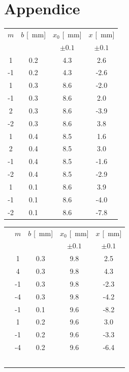 \documentclass[10pt,oneside,a4paper]{article}
\begin{document}
\newpage
\section{Appendice}


\begin{minipage}{.5\linewidth}
\begin{center}
\label{tab:misuraLambda}
\begin{tabular}{c|c|c|c}
$m$ & $b$ [\SI{}{mm}] & $x_0$ [\SI{}{mm}] & $x$ [\SI{}{mm}]\\
 & & $\pm 0.1$ & $\pm 0.1$\\
\hline
  1 & 0.2 & 4.3 &  2.6 \\
 -1 & 0.2 & 4.3 & -2.6 \\
  1 & 0.3 & 8.6 & -2.0 \\
 -1 & 0.3 & 8.6 &  2.0 \\
  2 & 0.3 & 8.6 & -3.9 \\
 -2 & 0.3 & 8.6 &  3.8 \\
  1 & 0.4 & 8.5 &  1.6 \\
  2 & 0.4 & 8.5 &  3.0 \\
 -1 & 0.4 & 8.5 & -1.6 \\
 -2 & 0.4 & 8.5 & -2.9 \\
  1 & 0.1 & 8.6 &  3.9 \\
 -1 & 0.1 & 8.6 & -4.0 \\
 -2 & 0.1 & 8.6 & -7.8 \\
\hline
\end{tabular}
\end{center}
\end{minipage}
\quad
\begin{minipage}{.5\linewidth}
\begin{center}
\label{tab:misuraLambda}
\begin{tabular}{cc|c|c|c}
&$m$ & $b$ [\SI{}{mm}] & $x_0$ [\SI{}{mm}] & $x$ [\SI{}{mm}]\\
& & & $\pm 0.1$ & $\pm 0.1$\\
\hline
 & 1 & 0.3 & 9.8 &  2.5 \\
 & 4 & 0.3 & 9.8 &  4.3 \\
 &-1 & 0.3 & 9.8 & -2.3 \\
 &-4 & 0.3 & 9.8 & -4.2 \\
 &-1 & 0.1 & 9.6 & -8.2 \\
 & 1 & 0.2 & 9.6 &  3.0 \\
 &-1 & 0.2 & 9.6 & -3.3 \\
 &-4 & 0.2 & 9.6 & -6.4 \\
\hline\\
\\
\\
\\
\\
\end{tabular}
\end{center}
\end{minipage}
\end{document}
